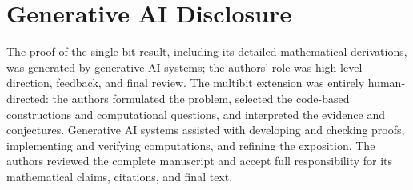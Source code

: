 \section*{Generative AI Disclosure}


The proof of the single-bit result, including its detailed mathematical derivations, was generated by generative AI systems; the authors' role was high-level direction, feedback, and final review. The multibit extension was entirely human-directed: the authors formulated the problem, selected the code-based constructions and computational questions, and interpreted the evidence and conjectures. Generative AI systems assisted with developing and checking proofs, implementing and verifying computations, and refining the exposition. The authors reviewed the complete manuscript and accept full responsibility for its mathematical claims, citations, and final text.
